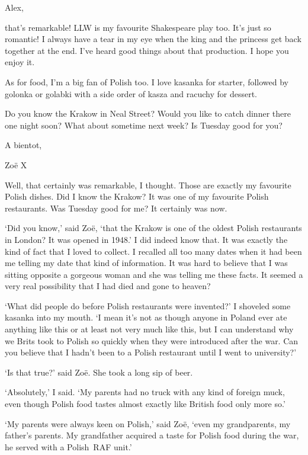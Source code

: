 \startmessage
Alex,

that's remarkable! LLW is my favourite Shakespeare play too. It's
just so romantic! I always have a tear in my eye when the king and
the princess get back together at the end. I've heard good things
about that production. I hope you enjoy it.

As for food, I'm a big fan of Polish too. I love kasanka for
starter, followed by golonka or golabki with a side order of kasza
and racuchy for dessert.

Do you know the Krakow in Neal Street? Would you like to catch
dinner there one night soon? What about sometime next week? Is
Tuesday good for you?

A bientot,

Zoë X
\stopmessage

Well, that certainly was remarkable, I thought. Those are exactly my
favourite Polish dishes. Did I know the Krakow? It was one of my
favourite Polish restaurants. Was Tuesday good for me? It certainly
was now.

\vskip 45pt

`Did you know,' said Zoë, `that the Krakow is one of the oldest
Polish restaurants in London? It was opened in 1948.' I did indeed
know that. It was exactly the kind of fact that I loved to collect.
I recalled all too many dates when it had been me telling my date
that kind of information. It was hard to believe that I was sitting
opposite a gorgeous woman and she was telling me these facts. It
seemed a very real possibility that I had died and gone to heaven?

`What did people do before Polish restaurants were invented?' I
shoveled some kasanka into my mouth. `I mean it's not as though
anyone in Poland ever ate anything like this or at least not very
much like this, but I can understand why we Brits took to Polish so
quickly when they were introduced after the war. Can you believe
that I hadn't been to a Polish restaurant until I went to
university?'

`Is that true?' said Zoë. She took a long sip of beer.

`Absolutely,' I said. `My parents had no truck with any kind of
foreign muck, even though Polish food tastes almost exactly like
British food only more so.'

`My parents were always keen on Polish,' said Zoë, `even my
grandparents, my father's parents. My grandfather acquired a taste
for Polish food during the war, he served with a Polish~RAF unit.'

